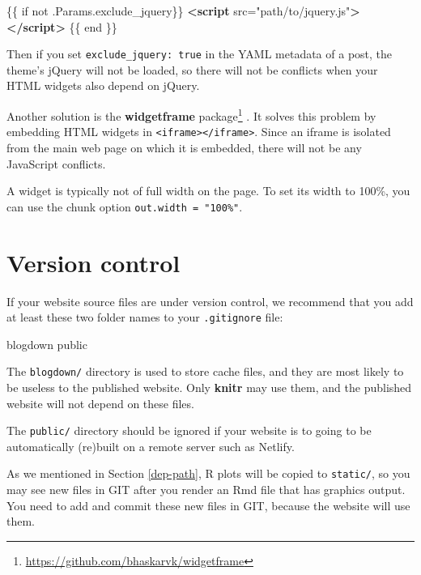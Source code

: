 \documentclass[12pt,]{krantz}
\makeatletter
\newenvironment{Shaded}{\begin{snugshade}}{\end{snugshade}}
\newcommand{\KeywordTok}[1]{\textcolor[rgb]{0.13,0.29,0.53}{\textbf{#1}}}
\newcommand{\StringTok}[1]{\textcolor[rgb]{0.31,0.60,0.02}{#1}}
\newcommand{\OtherTok}[1]{\textcolor[rgb]{0.56,0.35,0.01}{#1}}
\newcommand{\ExtensionTok}[1]{#1}
\newcommand{\NormalTok}[1]{#1}
\renewcommand{\href}[2]{#2\footnote{\url{#1}}}
\newenvironment{kframe}{%
\medskip{}
\setlength{\fboxsep}{.8em}
 \def\at@end@of@kframe{}%
 \ifinner\ifhmode%
  \def\at@end@of@kframe{\end{minipage}}%
  \begin{minipage}{\columnwidth}%
 \fi\fi%
 \def\FrameCommand##1{\hskip\@totalleftmargin \hskip-\fboxsep
 \colorbox{shadecolor}{##1}\hskip-\fboxsep
     \hskip-\linewidth \hskip-\@totalleftmargin \hskip\columnwidth}%
 \MakeFramed {\advance\hsize-\width
   \@totalleftmargin\z@ \linewidth\hsize
   \@setminipage}}%
 {\par\unskip\endMakeFramed%
 \at@end@of@kframe}
\renewenvironment{Shaded}{\begin{kframe}}{\end{kframe}}
\theoremstyle{definition}
\theoremstyle{definition}
\theoremstyle{definition}
\theoremstyle{remark}
\makeatother
\begin{document}
\begin{Shaded}
\begin{Highlighting}[]
\NormalTok{\{\{ if not .Params.exclude_jquery\}\}}
\KeywordTok{<script}\OtherTok{ src=}\StringTok{"path/to/jquery.js"}\KeywordTok{></script>}
\NormalTok{\{\{ end \}\}}
\end{Highlighting}
\end{Shaded}

Then if you set \texttt{exclude\_jquery:\ true} in the YAML metadata of
a post, the theme's jQuery will not be loaded, so there will not be
conflicts when your HTML widgets also depend on jQuery.

Another solution is the
\href{https://github.com/bhaskarvk/widgetframe}{\textbf{widgetframe}
package} \citep{R-widgetframe}. It solves this problem by embedding HTML
widgets in
\texttt{\textless{}iframe\textgreater{}\textless{}/iframe\textgreater{}}.
Since an iframe is isolated from the main web page on which it is
embedded, there will not be any JavaScript conflicts.

A widget is typically not of full width on the page. To set its width to
100\%, you can use the chunk option \texttt{out.width\ =\ "100\%"}.

\section{Version control}\label{version-control}

If your website source files are under version
control, we recommend that you add at least these
two folder names to your \texttt{.gitignore} file:

\begin{Shaded}
\begin{Highlighting}[]
\ExtensionTok{blogdown}
\ExtensionTok{public}
\end{Highlighting}
\end{Shaded}

The \texttt{blogdown/} directory is used to store cache files, and they
are most likely to be useless to the published website. Only
\textbf{knitr} may use them, and the published website will not depend
on these files.

The \texttt{public/} directory should be ignored if your website is to
going to be automatically (re)built on a remote server such as Netlify.

As we mentioned in Section \ref{dep-path}, R plots will be copied to
\texttt{static/}, so you may see new files in GIT after you render an
Rmd file that has graphics output. You need to add and commit these new
files in GIT, because the website will use them.
\end{document}
